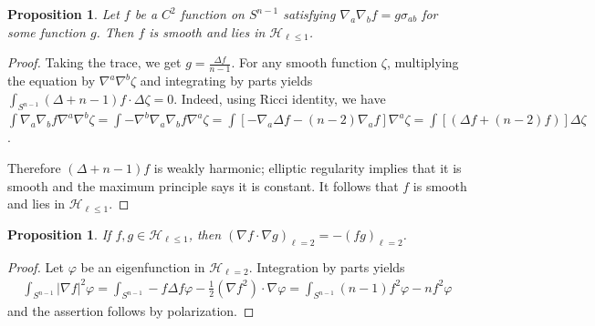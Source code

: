 \documentclass[12pt,twoside]{article}
\theoremstyle{plain}
\newtheorem{prop}[theorem]{Proposition}
\theoremstyle{definition}
\theoremstyle{remark}
\newcommand{\vphi}{\varphi}
\newcommand{\na}{\nabla}
\numberwithin{equation}{section}
\begin{document}
\begin{prop}\label{characterizing Hle1}
Let $f$ be a $C^2$ function on $S^{n-1}$ satisfying $\na_a\na_b f = g \sigma_{ab}$ for some function $g$. Then $f$ is smooth and lies in $\mathcal{H}_{\ell\le 1}$.
\end{prop}
\begin{proof}
Taking the trace, we get $g = \frac{\Delta f}{n-1}$. For any smooth function $\zeta$, multiplying the equation by $\na^a\na^b \zeta$ and integrating by parts yields $\int_{S^{n-1}} (\Delta + n-1)f \cdot \Delta\zeta  =0$. Indeed, using Ricci identity, we have $\int \na_a\na_b f \na^a \na^b \zeta =  \int  -\na^b\na_a\na_b f \na^a \zeta = \int [-\na_a \Delta f - (n-2)\na_a f] \na^a \zeta = \int [(\Delta f + (n-2)f)]\Delta \zeta$.

Therefore $(\Delta+n-1)f$ is weakly harmonic; elliptic regularity implies that it is smooth and the maximum principle says it is constant. It follows that $f$ is smooth and lies in $\mathcal{H}_{\ell\le 1}$.
\end{proof}
\begin{prop}\label{product of first eigenfunctions}
If $f,g \in \mathcal{H}_{\ell\le 1}$, then $(\na f \cdot \na g)_{\ell=2} = - (fg)_{\ell=2}$.
\end{prop}
\begin{proof}
Let $\vphi$ be an eigenfunction in $\mathcal{H}_{\ell=2}.$ Integration by parts yields 
\begin{align*}
\int_{S^{n-1}} |\na f|^2 \vphi = \int_{S^{n-1}} - f \Delta f \vphi - \frac{1}{2} (\na f^2) \cdot \na\vphi = \int_{S^{n-1}} (n-1)f^2 \vphi - n f^2 \vphi
\end{align*}
and the assertion follows by polarization.
\end{proof}
\end{document}
